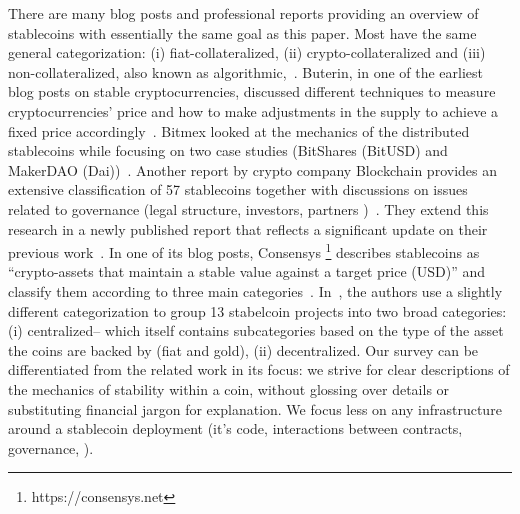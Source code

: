 There are many blog posts and professional reports providing an overview of stablecoins with essentially the same goal as this paper. Most have the same general categorization: (i) fiat-collateralized, (ii) crypto-collateralized and (iii) non-collateralized, also known as algorithmic,\eg~\cite{hackernoon, comprehensiveOverview, linkedin}. Buterin, in one of the earliest blog posts on stable cryptocurrencies, discussed different techniques to measure cryptocurrencies' price and how to make adjustments in the supply to achieve a fixed price accordingly~\cite{TheSearc7:online}. Bitmex looked at the mechanics of the distributed stablecoins while focusing on two case studies (\ie BitShares (BitUSD) and MakerDAO (Dai))~\cite{bitmex}. Another report by crypto company Blockchain provides an extensive classification of 57 stablecoins together with discussions on issues related to governance (\eg legal structure, investors, partners \etc)~\cite{reportone}. They extend this research in a newly published report that reflects a significant update on their previous work~\cite{reporttwo}. In one of its blog posts, Consensys \footnote{https://consensys.net} describes stablecoins as ``crypto-assets that maintain a stable value against a target price (\eg USD)'' and classify them according to three main categories~\cite{StateofS96:online}. In~\cite{cryptoinsider}, the authors use a slightly different categorization to group 13 stabelcoin projects into two broad categories: (i) centralized-- which itself contains subcategories based on the type of the asset the coins are backed by (\eg fiat and gold), (ii) decentralized. Our survey can be differentiated from the related work in its focus: we strive for clear descriptions of the mechanics of stability within a coin, without glossing over details or substituting financial jargon for explanation. We focus less on any infrastructure around a stablecoin deployment (\eg it's code, interactions between contracts, governance, \etc).



